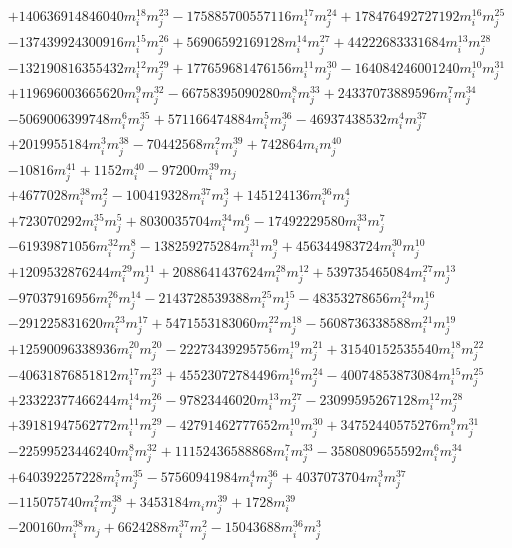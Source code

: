 {\begin{align*}
&+140636914846040m_i^{18}m_j^{23}-175885700557116m_i^{17}m_j^{24}+178476492727192m_i^{16}m_j^{25}\\
&-137439924300916m_i^{15}m_j^{26}+56906592169128m_i^{14}m_j^{27}+44222683331684m_i^{13}m_j^{28}\\
&-132190816355432m_i^{12}m_j^{29}+177659681476156m_i^{11}m_j^{30}-164084246001240m_i^{10}m_j^{31}\\
&+119696003665620m_i^{9}m_j^{32}-66758395090280m_i^{8}m_j^{33}+24337073889596m_i^{7}m_j^{34}\\
&-5069006399748m_i^{6}m_j^{35}+571166474884m_i^{5}m_j^{36}-46937438532m_i^{4}m_j^{37}\\
&+2019955184m_i^{3}m_j^{38}-70442568m_i^{2}m_j^{39}+742864m_im_j^{40}\\
&-10816m_j^{41}+1152m_i^{40}-97200m_i^{39}m_j\\
&+4677028m_i^{38}m_j^{2}-100419328m_i^{37}m_j^{3}+145124136m_i^{36}m_j^{4}\\
&+723070292m_i^{35}m_j^{5}+8030035704m_i^{34}m_j^{6}-17492229580m_i^{33}m_j^{7}\\
&-61939871056m_i^{32}m_j^{8}-138259275284m_i^{31}m_j^{9}+456344983724m_i^{30}m_j^{10}\\
&+1209532876244m_i^{29}m_j^{11}+2088641437624m_i^{28}m_j^{12}+539735465084m_i^{27}m_j^{13}\\
&-97037916956m_i^{26}m_j^{14}-2143728539388m_i^{25}m_j^{15}-48353278656m_i^{24}m_j^{16}\\
&-291225831620m_i^{23}m_j^{17}+5471553183060m_i^{22}m_j^{18}-5608736338588m_i^{21}m_j^{19}\\
&+12590096338936m_i^{20}m_j^{20}-22273439295756m_i^{19}m_j^{21}+31540152535540m_i^{18}m_j^{22}\\
&-40631876851812m_i^{17}m_j^{23}+45523072784496m_i^{16}m_j^{24}-40074853873084m_i^{15}m_j^{25}\\
&+23322377466244m_i^{14}m_j^{26}-97823446020m_i^{13}m_j^{27}-23099595267128m_i^{12}m_j^{28}\\
&+39181947562772m_i^{11}m_j^{29}-42791462777652m_i^{10}m_j^{30}+34752440575276m_i^{9}m_j^{31}\\
&-22599523446240m_i^{8}m_j^{32}+11152436588868m_i^{7}m_j^{33}-3580809655592m_i^{6}m_j^{34}\\
&+640392257228m_i^{5}m_j^{35}-57560941984m_i^{4}m_j^{36}+4037073704m_i^{3}m_j^{37}\\
&-115075740m_i^{2}m_j^{38}+3453184m_im_j^{39}+1728m_i^{39}\\
&-200160m_i^{38}m_j+6624288m_i^{37}m_j^{2}-15043688m_i^{36}m_j^{3}\\

\end{align*}}
